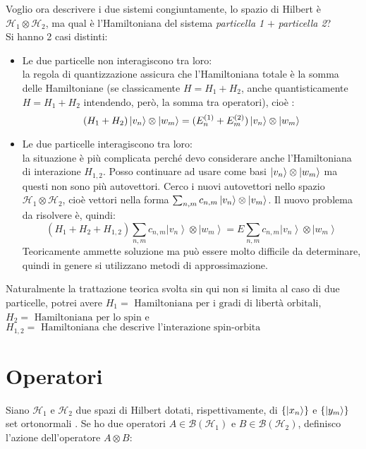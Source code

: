 Voglio ora descrivere i due sistemi congiuntamente, lo spazio di Hilbert è $ \mathcal{H}_1 \otimes \mathcal{H}_2$, ma qual è l'Hamiltoniana del sistema \emph{particella 1}  $+$ \emph{particella 2}? \\
Si hanno 2 casi distinti:
\begin{itemize}

\item Le due particelle non interagiscono tra loro: \\
 la regola di quantizzazione assicura che l'Hamiltoniana totale è la somma delle Hamiltoniane (se classicamente ${H} = {H}_1 + {H}_2$, anche quantisticamente ${H} = {H}_1 + {H}_2$ intendendo, però, la somma tra operatori), cioè :
 \begin{equation}
({H}_1 + {H}_2) \ket{v_n} \otimes \ket{w_m} =  (E^{(1)}_n + E^{(2)}_m) \ket{v_n} \otimes \ket{w_m}
 \end{equation}

\item Le due particelle interagiscono tra loro: \\
 la situazione è più complicata perché devo considerare anche l'Hamiltoniana di interazione ${H}_{1,2} $. Posso continuare ad usare come basi $\ket{v_n} \otimes \ket{w_m}$ ma questi non sono più autovettori. Cerco i nuovi autovettori nello spazio $\mathcal{H}_1 \otimes \mathcal{H}_2 $, cioè vettori nella forma $ \sum_{n,m} c_{n,m} \ket{v_n} \otimes \ket{v_m} $.
Il nuovo problema da risolvere è, quindi:
 \begin{equation}
\left(H_1+H_2+H_{1,2}\right)\sum_{n,m}{c_{n,m}\left |v_n \right\rangle \otimes \left |w_m \right\rangle}=E\sum_{n,m}{c_{n,m}\left |v_n \right\rangle \otimes \left |w_m \right\rangle}
 \end{equation}
Teoricamente ammette soluzione ma può essere molto difficile da determinare, quindi in genere si utilizzano metodi di approssimazione.
\end{itemize}

Naturalmente la trattazione teorica svolta sin qui non si limita al caso di due particelle, potrei avere $H_1=\mbox{ Hamiltoniana per i gradi di libertà orbitali}$, $H_2=\mbox{ Hamiltoniana per lo spin}$ e $H_{1,2}=\mbox{ Hamiltoniana che descrive l'interazione spin-orbita}$  

\section{Operatori} %
Siano $\mathcal{H}_1$ e $\mathcal{H}_2 $  due spazi di Hilbert dotati, rispettivamente, di $\{ \ket{x_n} \}$ e $\{ \ket{y_m} \}$ set ortonormali .
Se ho due operatori $A\in\mathcal{B}(\mathcal{H}_1)$ e $B\in \mathcal{B}(\mathcal{H}_2)$, definisco l'azione dell'operatore  $A\otimes B$:

